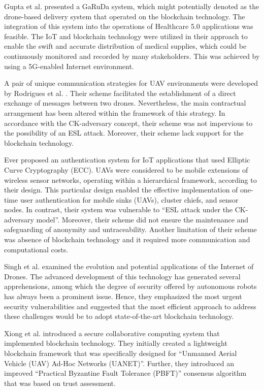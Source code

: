Gupta et al. presented a GaRuDa system, which might potentially denoted as the drone-based delivery system that operated on the blockchain technology. The integration of this system into the operations of Healthcare 5.0 applications was feasible. The IoT and blockchain technology were utilized in their approach to enable the swift and accurate distribution of medical supplies, which could be continuously monitored and recorded by many stakeholders. This was achieved by using a 5G-enabled Internet environment.

A pair of unique communication strategies for UAV environments were developed by Rodrigues et al. . Their scheme facilitated the establishment of a direct exchange of messages between two drones. Nevertheless, the main contractual arrangement has been altered within the framework of this strategy. In accordance with the CK-adversary concept, their scheme was not impervious to the possibility of an ESL attack. Moreover, their scheme lack support for the blockchain technology.

Ever  proposed an authentication system for IoT applications that used Elliptic Curve Cryptography (ECC). UAVs were considered to be mobile extensions of wireless sensor networks, operating within a hierarchical framework, according to their design. This particular design enabled the effective implementation of one-time user authentication for mobile sinks (UAVs), cluster chiefs, and sensor nodes. In contrast, their system was vulnerable to ``ESL attack under the CK-adversary model''. Moreover, their scheme did not ensure the maintenance and safeguarding of anonymity and untraceability. Another limitation of their scheme was absence of blockchain technology and it required more communication and computational costs.

Singh et al. examined the evolution and potential applications of the Internet of Drones. The advanced development of this technology has generated several apprehensions, among which the degree of security offered by autonomous robots has always been a prominent issue. Hence, they emphasized the most urgent security vulnerabilities and suggested that the most efficient approach to address these challenges would be to adopt state-of-the-art blockchain technology.

Xiong et al. introduced a secure collaborative computing system that implemented blockchain technology. They initially created a lightweight blockchain framework that was specifically designed for ``Unmanned Aerial Vehicle (UAV) Ad-Hoc Networks (UANET)''. Further, they introduced an improved ``Practical Byzantine Fault Tolerance (PBFT)'' consensus algorithm that was based on trust assessment.

